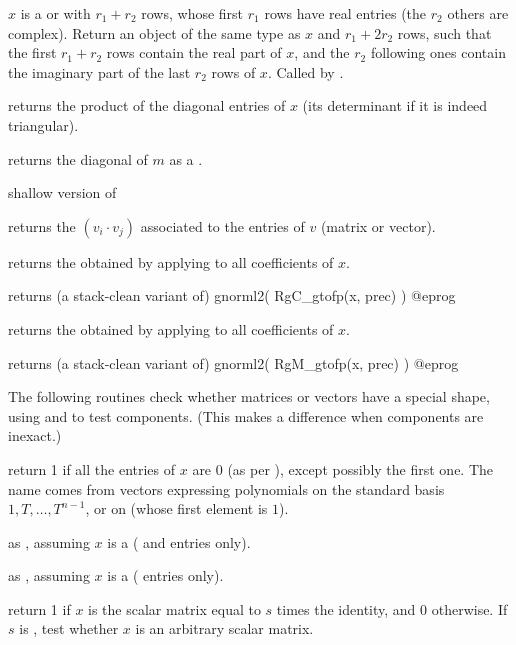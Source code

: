  $x$ is a  or
 with $r_1 + r_2$ rows, whose first $r_1$ rows have real entries
(the $r_2$ others are complex). Return an object of the same type as
$x$ and $r_1 + 2r_2$ rows, such that the first $r_1 + r_2$ rows contain
the real part of $x$, and the $r_2$ following ones contain the imaginary part
of the last $r_2$ rows of $x$. Called by .

 returns the product of the diagonal
entries of $x$ (its determinant if it is indeed triangular).

 returns the diagonal of $m$ as a .

 shallow version of 

 returns the  $(v_i\cdot v_j)$
associated to the entries of $v$ (matrix or vector).

 returns the  obtained by
applying  to all coefficients of $x$.

 returns (a stack-clean variant of)
\bprog
  gnorml2( RgC_gtofp(x, prec) )
@eprog

 returns the  obtained by
applying  to all coefficients of $x$.

 returns (a stack-clean variant of)
\bprog
  gnorml2( RgM_gtofp(x, prec) )
@eprog

The following routines check whether matrices or vectors have a special
shape, using  and  to test components. (This makes a
difference when components are inexact.)

 return 1 if all the entries of $x$ are $0$
(as per ), except possibly the first one. The name comes from
vectors expressing polynomials on the standard basis $1,T,\dots, T^{n-1}$, or
on  (whose first element is $1$).

 as , assuming $x$ is a
 ( and  entries only).

 as , assuming $x$ is a
 ( entries only).

 return 1 if $x$ is the scalar matrix
equal to $s$ times the identity, and 0 otherwise. If $s$ is , test
whether $x$ is an arbitrary scalar matrix.


